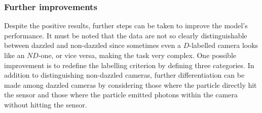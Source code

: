 \subsubsection{Further improvements}
Despite the positive results, further steps can be taken to improve the model's performance. It must be noted that the data are not so clearly distinguishable between dazzled and non-dazzled since sometimes even a $D$-labelled camera looks like an $ND$-one, or vice versa, making the task very complex. One possible improvement is to redefine the labelling criterion by defining three categories.  In addition to distinguishing non-dazzled cameras, further differentiation can be made among dazzled cameras by considering those where the particle directly hit the sensor and those where the particle emitted photons within the camera without hitting the sensor.